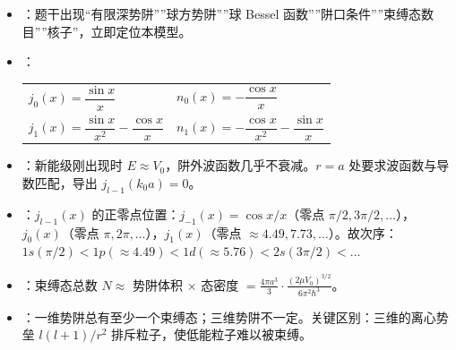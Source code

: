 \begin{tipbox}[快速识别与解题技巧]
\begin{itemize}
    \item {}：题干出现``有限深势阱''''球方势阱''''球 Bessel 函数''''阱口条件''''束缚态数目''''核子''，立即定位本模型。
    \item {}：
    \begin{center}
    \begin{tabular}{ll}
    \toprule
    $j_0(x)=\dfrac{\sin x}{x}$ & $n_0(x)=-\dfrac{\cos x}{x}$ \\
    $j_1(x)=\dfrac{\sin x}{x^2}-\dfrac{\cos x}{x}$ & $n_1(x)=-\dfrac{\cos x}{x^2}-\dfrac{\sin x}{x}$ \\
    \bottomrule
    \end{tabular}
    \end{center}
    \item {}：新能级刚出现时 $E\approx V_0$，阱外波函数几乎不衰减。$r=a$ 处要求波函数与导数匹配，导出 $j_{l-1}(k_0a)=0$。
    \item {}：$j_{l-1}(x)$ 的正零点位置：$j_{-1}(x)=\cos x/x$（零点 $\pi/2,3\pi/2,\ldots$），$j_0(x)$（零点 $\pi,2\pi,\ldots$），$j_1(x)$（零点 $\approx4.49,7.73,\ldots$）。故次序：$1s(\pi/2)<1p(\approx4.49)<1d(\approx5.76)<2s(3\pi/2)<\ldots$
    \item {}：束缚态总数 $N\approx$ 势阱体积 $\times$ 态密度 $=\frac{4\pi a^3}{3}\cdot\frac{(2\mu V_0)^{3/2}}{6\pi^2\hbar^3}$。
    \item {}：一维势阱总有至少一个束缚态；三维势阱不一定。关键区别：三维的离心势垒 $l(l+1)/r^2$ 排斥粒子，使低能粒子难以被束缚。
\end{itemize}
\end{tipbox}

